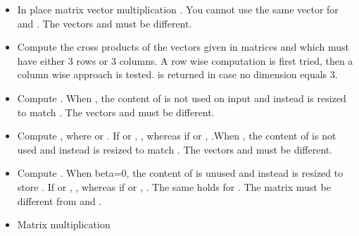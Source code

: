 \begin{itemize}
\item {} 
  \sshortdescribe In place matrix vector multiplication  .  You
  cannot use the same vector for  and . The vectors  and 
  must be different.

\item {}
  \sshortdescribe Compute the cross products of the vectors given in matrices
   and  which must have either 3 rows or 3 columns. A row wise
  computation is first tried, then a column wise approach is tested.
   is returned in case no dimension equals 3.

  
\item {} 
  \sshortdescribe Compute . When , the
  content of  is not used on input and instead  is resized to
  match . The vectors  and  must be different.


\item {}
  \sshortdescribe Compute , where  or . If  or , , whereas if  or , .When
  , the content of  is not used and instead  is resized
  to match . The vectors  and  must be different.

\item {}
  \sshortdescribe Compute . When beta=0, the content of  is unused and instead 
  is resized to store . If  or
  , , whereas if  or
  , . The same holds for . The matrix
   must be different from  and .
  
\item {} 
  \sshortdescribe Matrix multiplication  


\end{itemize}
